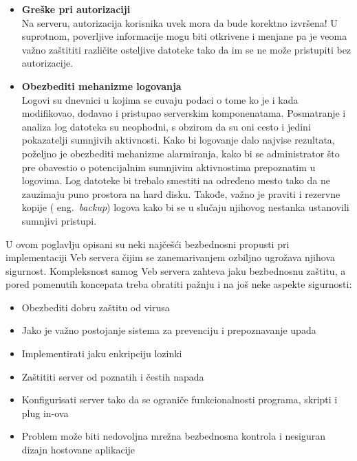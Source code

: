 \documentclass[a4paper]{article}
\begin{document}
\begin{itemize}
    \item \textbf{ Greške pri autorizaciji } \\
    Na serveru, autorizacija korisnika uvek mora da bude korektno izvršena! U suprotnom, poverljive informacije mogu biti otkrivene i menjane pa je veoma važno zaštititi različite osteljive datoteke tako da im se ne može pristupiti bez autorizacije. 
   
    \item \textbf{Obezbediti mehanizme logovanja} \\
    Logovi su dnevnici u kojima se cuvaju podaci o tome ko je i kada modifikovao, dodavao i pristupao serverskim komponenatama. Posmatranje i analiza log datoteka su neophodni, s obzirom da su oni cesto i jedini pokazatelji sumnjivih aktivnosti. Kako bi logovanje dalo najvise rezultata, poželjno je obezbediti mehanizme alarmiranja, kako bi se administrator što pre obavestio o potencijalnim sumnjivim aktivnostima prepoznatim u logovima. Log datoteke bi trebalo smestiti na određeno mesto tako da ne zauzimaju puno prostora na hard disku. Takođe, važno je praviti i rezervne kopije ( eng.~{\em  backup}) logova kako bi se u slučaju njihovog nestanka ustanovili sumnjivi pristupi. 
  \end{itemize}
  
  U ovom poglavlju opisani su neki najčešći bezbednosni propusti pri implementaciji Veb servera čijim se zanemarivanjem ozbiljno ugrožava njihova sigurnost. Kompleksnost samog Veb servera zahteva jaku bezbednosnu zaštitu, a pored pomenutih koncepata treba obratiti pažnju i na još neke aspekte sigurnosti:
   
   \begin{itemize}      
    \item Obezbediti dobru zaštitu od virusa 
    \item Jako je važno postojanje sistema za prevenciju i prepoznavanje upada 
    \item Implementirati jaku enkripciju lozinki 
    \item Zaštititi server od poznatih i čestih napada
    \item Konfigurisati server tako da se ograniče funkcionalnosti programa, skripti i plug in-ova \cite{scpws}
    \item Problem može biti nedovoljna mrežna bezbednosna kontrola i nesiguran dizajn hostovane aplikacije
      \end{itemize}
\end{document}
